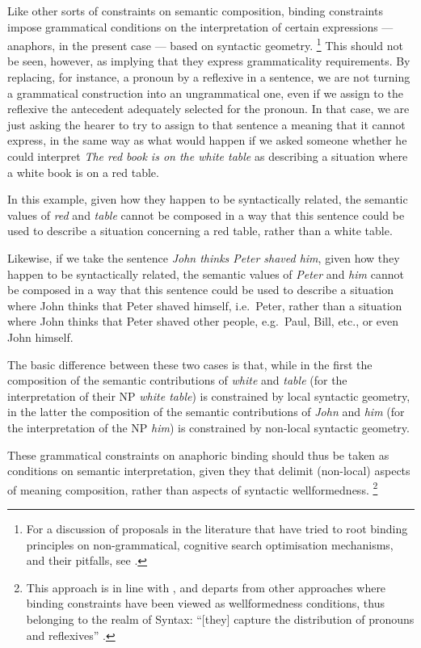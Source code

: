 \documentclass[output=paper
,modfonts
,nonflat]{langsci/langscibook}
\begin{document}
Like other sorts of constraints on semantic composition, binding
constraints impose grammatical conditions on the interpretation of certain expressions
--- anaphors, in the present case --- based on syntactic geometry.%
\footnote{
For a discussion of proposals in the literature that have tried to root binding principles on non-grammatical,
cognitive search optimisation mechanisms, and their pitfalls, see \citep{branco:2000,branco:2003,branco:2004}.
}
This should not
be seen, however, as implying that they
express grammaticality requirements. By replacing, for instance, a pronoun 
by a reflexive in a sentence, we are not turning a grammatical construction into 
an ungrammatical one, even if we assign to the reflexive the 
antecedent adequately selected for the pronoun. In that case, we 
are just asking the hearer to try to assign to that sentence a 
meaning that it cannot express, in the same way as what would 
happen if we asked someone whether he could interpret {\it The red book 
is on the white table} as describing a situation where a white 
book is on a red table. 

In this example, given how they happen to be syntactically related, 
the semantic values of {\it red} and {\it table} cannot be composed in a way 
that this sentence could be used to describe a situation 
concerning a red table, rather than a white table. 

Likewise, if we 
take the sentence {\it John thinks Peter shaved him}, given how they happen to be 
syntactically related, the semantic values of {\it Peter} and {\it him} cannot 
be composed in a way that this sentence could be used to describe a 
situation where John thinks that Peter shaved himself, i.e.\ Peter, rather than
a situation where John thinks that Peter shaved other people, e.g.\ Paul,
Bill, etc., or even John himself. 

The 
basic difference between these two cases is that, while in the 
first the composition of the semantic contributions of {\it white} and 
{\it table} (for the interpretation of their NP {\it white table}) is constrained by local
syntactic geometry, in the
latter the composition of the semantic contributions of {\it John} 
and {\it him} (for the interpretation of the NP {\it him}) is 
constrained by non-local syntactic geometry.

These grammatical constraints on anaphoric binding should thus be taken as conditions on semantic interpretation,
given they that delimit (non-local) aspects of meaning composition,
rather than aspects of syntactic wellformedness.%
%
\footnote{
This approach is in line with \citep{gawron:anaph90}, and departs from other approaches where binding constraints have been viewed as 
wellformedness conditions, thus belonging to the
realm of Syntax: ``[they] capture  the distribution of pronouns and reflexives''
\citep[p.657]{rein:refl93}.}
\end{document}
